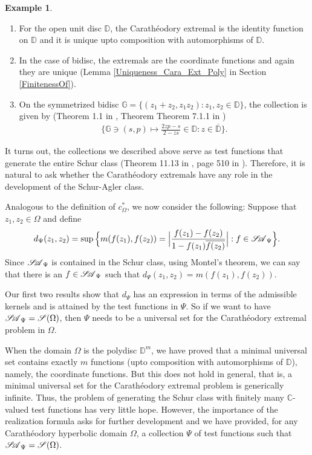 \documentclass[12pt]{amsart}
\theoremstyle{definition}
\newtheorem{example}[theorem]{Example}
\numberwithin{equation}{section}
\newcommand{\D}{\mathbb{D}}
\newcommand{\SA}{\mathscr{S\mspace{-5mu}A}}
\begin{document}
\begin{example}
	\begin{enumerate}
		\item For the open unit disc $\D$, the Carath\'eodory extremal is the identity function on $\D$ and it is unique upto composition with automorphisms of $\D$.
		\item In the case of bidisc, the extremals are  the coordinate functions and again they are unique (Lemma \ref{Uniqueness_Cara_Ext_Poly} in Section \ref{FinitenessOf}). 
		\item On the symmetrized bidisc $\mathbb{G}=\{(z_1+z_2,z_1z_2):z_1,z_2\in \D\}$, the collection is given by (Theorem 1.1 in \cite{AglerYounHyperbolic}, Theorem Theorem 7.1.1 in \cite{J-P-Invariant})
		\begin{align*}
			\{\mathbb{G}\ni(s,p)\mapsto \frac{2zp-s}{2-zs}\in \D:z\in \overline{\D}\}.
		\end{align*}
	\end{enumerate}
\end{example}
It turns out, the collections we described above serve as test functions that generate the entire Schur class (Theorem 11.13 in \cite{A-M}, page 510 in \cite{B-S}). Therefore, it is natural to ask whether the Carath\'eodory extremals have any role in the development of the Schur-Agler class.

Analogous to the definition of $c^* _\Omega$, we now consider the following: Suppose that $z_1, z_2\in \Omega$ and define
\begin{align}\label{invariant_distance}
	d_\Psi (z_1,z_2)=\sup \Big\{ m(f(z_1), f(z_2))=\Big|\frac{f(z_1) -f(z_2)}{1- f(z_1) \overline{f(z_2)}}\Big|:f\in \SA_\Psi\Big\}.
\end{align}
Since $\SA_\Psi$ is contained in the Schur class, using Montel's theorem, we can say that there is an $f\in \SA_\Psi$ such that $d_\Psi (z_1,z_2)=m(f(z_1), f(z_2))$.

Our first two results show that $d_\Psi$ has an expression in terms of the admissible kernels and is attained by the test functions in $\Psi$. So if we want to have $\SA_\Psi =\mathscr{S}(\Omega)$, then $\Psi$ needs to be a universal set for the Carath\'eodory extremal problem in $\Omega$.

When the domain $\Omega$ is the polydisc $\D^m$, we have proved that a minimal universal set contains exactly $m$ functions (upto composition with automorphisms of $\D$), namely, the coordinate functions. But this does not hold in general, that is, a minimal universal set for the Carath\'eodory extremal problem is generically infinite. Thus, the problem of generating the Schur class with finitely many $\mathbb{C}$-valued test functions has very little hope. However, the importance of the realization formula asks for further development and we have provided, for any Carath\'eodory hyperbolic domain $\Omega$, a collection $\Psi$ of test functions such that $\SA_\Psi=\mathscr{S}(\Omega)$.
\end{document}
